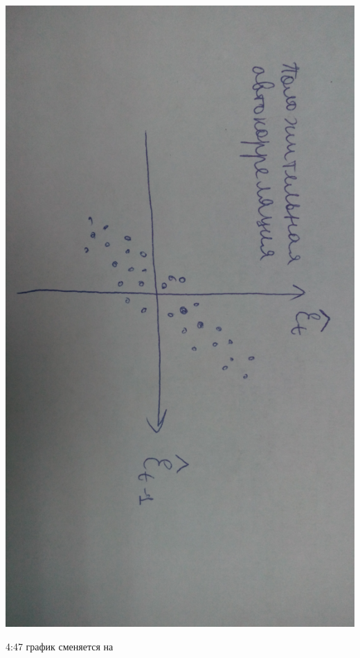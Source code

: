 \documentclass[12pt,a4paper]{article}
\begin{document}
\includegraphics[scale=0.05, angle=90]{autocorr_1.jpg} 

4:47  график сменяется на 
\end{document}
